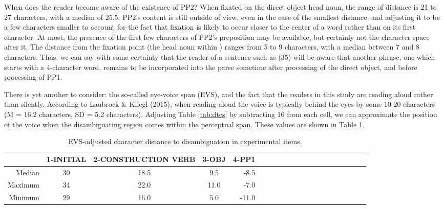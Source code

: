 \documentclass[12pt,oneside]{book}
\begin{document}
When does the reader become aware of the existence of PP2? When fixated on the direct object head noun, the range of distance is 21 to 27 characters, with a median of 25.5: PP2's content is still outside of view, even in the case of the smallest distance, and adjusting it to be a few characters smaller to account for the fact that fixation is likely to occur closer to the center of a word rather than on its first character. At most, the presence of the first few characters of PP2's preposition may be available, but certainly not the character space after it. The distance from the  fixation point (the head noun within )  ranges from 5 to 9 characters, with a median between 7 and 8 characters. Thus, we can say with some certainty that the reader of a sentence such as (35) will be aware that another phrase, one which starts with a 4-character word, remains to be incorporated into the parse sometime after processing of the direct object, and before processing of PP1.

There is yet another  to consider: the so-called eye-voice span (EVS), and the fact that the readers in this study are reading aloud rather than silently. According to Laubrock \& Kliegl (2015), when reading aloud the voice is typically behind the eyes by some 10-20 characters (M = 16.2 characters, SD = 5.2 characters). Adjusting Table \ref{tab:dtcs} by subtracting 16 from each cell, we can approximate the position of the voice when the disambiguating region comes within the perceptual span. These values are shown in Table \ref{tab:evsdtcr}.

\begin{table}[!h]

\caption{\label{tab:evsdtcr}EVS-adjusted character distance to disambiguation in experimental items.}
\centering
\begin{tabular}{rcccrcccrcccrcccrccc}
\toprule
  & 1-INITIAL & 2-CONSTRUCTION VERB & 3-OBJ & 4-PP1\\
\midrule
Median & 30 & 18.5 & 9.5 & -8.5\\
Maximum & 34 & 22.0 & 11.0 & -7.0\\
Minimum & 29 & 16.0 & 5.0 & -11.0\\
\bottomrule
\end{tabular}
\end{table}
\end{document}
